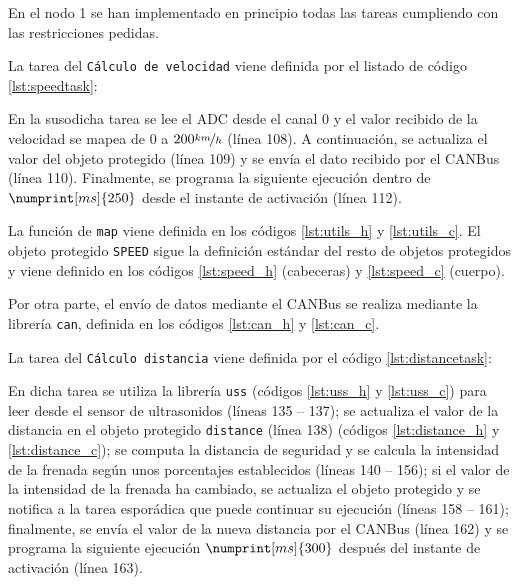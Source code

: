 En el nodo 1 se han implementado en principio todas las tareas cumpliendo con las
restricciones pedidas.

La tarea del \texttt{Cálculo de velocidad} viene definida por el listado de código
\ref{lst:speedtask}:



En la susodicha tarea se lee el ADC desde el canal 0 y el valor recibido de la velocidad
se mapea de $0$ a $200 \nicefrac{km}{h}$ (línea 108). A continuación, se actualiza el valor del
objeto protegido (línea 109) y se envía el dato recibido por el CANBus (línea 110).
Finalmente, se programa la siguiente ejecución dentro de $\numprint[ms]{250}$ desde el
instante de activación (línea 112).

La función de \texttt{map} viene definida en los códigos \ref{lst:utils_h} y \ref{lst:utils_c}.
El objeto protegido \texttt{SPEED} sigue la definición estándar del resto de objetos
protegidos y viene definido en los códigos \ref{lst:speed_h} (cabeceras) y \ref{lst:speed_c}
(cuerpo).

Por otra parte, el envío de datos mediante el CANBus se realiza mediante la librería
\texttt{can}, definida en los códigos \ref{lst:can_h} y \ref{lst:can_c}.

La tarea del \texttt{Cálculo distancia} viene definida por el código \ref{lst:distancetask}:



En dicha tarea se utiliza la librería \texttt{uss} (códigos \ref{lst:uss_h} y \ref{lst:uss_c})
para leer desde el sensor de ultrasonidos (líneas 135 -- 137); se actualiza el valor de la distancia en el
objeto protegido \texttt{distance} (línea 138) (códigos \ref{lst:distance_h} y \ref{lst:distance_c});
se computa la distancia de seguridad y se calcula la intensidad de la frenada
según unos porcentajes establecidos (líneas 140 -- 156); si el valor de la intensidad de
la frenada ha cambiado, se actualiza el objeto protegido y se notifica a la tarea
esporádica que puede continuar su ejecución (líneas 158 -- 161); finalmente, se
envía el valor de la nueva distancia por el CANBus (línea 162) y se programa la
siguiente ejecución $\numprint[ms]{300}$ después del instante de activación (línea 163).

